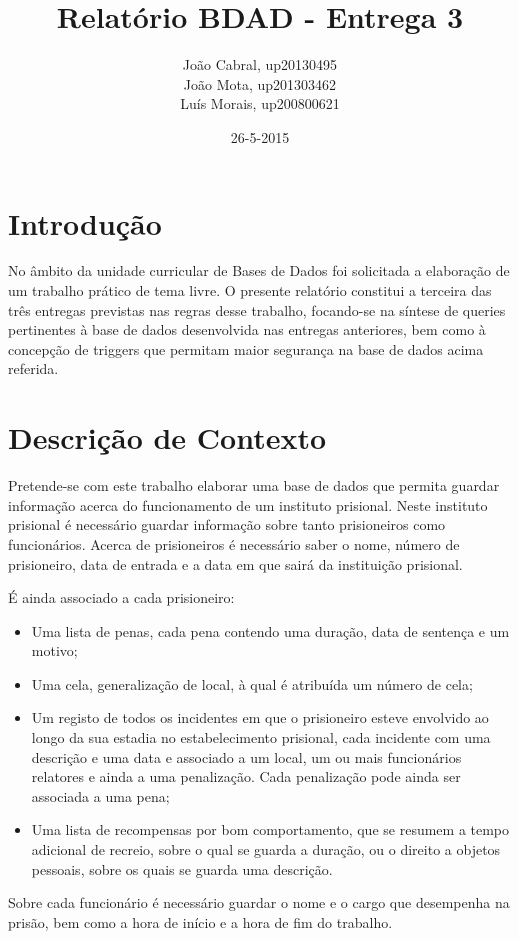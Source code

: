 \documentclass{article}
\title{Relatório BDAD - Entrega 3}
\date{26-5-2015}
\author{João Cabral, up20130495\\
	   João Mota, up201303462\\
	   Luís Morais, up200800621\\}
\begin{document}
\maketitle
{}
\newpage
{}
\renewcommand*\contentsname{Sumário}
\tableofcontents
\newpage
\section{Introdução}
No âmbito da unidade curricular de Bases de Dados foi solicitada a elaboração de um
trabalho prático de tema livre. O presente relatório constitui a terceira das três entregas
previstas nas regras desse trabalho, focando-se na síntese de queries pertinentes à 
base de dados desenvolvida nas entregas anteriores, bem como
à concepção de triggers que permitam maior segurança na base de dados acima referida.


\section{Descrição de Contexto}
Pretende-se com este trabalho elaborar uma base de dados que permita guardar
informação acerca do funcionamento de um instituto prisional. Neste instituto prisional é
necessário guardar informação sobre tanto prisioneiros como funcionários.
Acerca de prisioneiros é necessário saber o nome, número de prisioneiro, data de entrada
e a data em que sairá da instituição prisional.

É ainda associado a cada prisioneiro:
\begin{itemize}
\item Uma lista de penas, cada pena contendo uma duração, data de sentença e um motivo;
\item Uma cela, generalização de local, à qual é atribuída um número de cela;
\item Um registo de todos os incidentes em que o prisioneiro esteve envolvido ao longo da sua estadia no estabelecimento prisional, cada incidente com uma descrição e uma data e associado a um local, um ou mais funcionários relatores e ainda a uma penalização. Cada penalização pode ainda ser associada a uma pena;
\item Uma lista de recompensas por bom comportamento, que se resumem a tempo adicional de recreio, sobre o qual se guarda a duração, ou o direito a objetos pessoais, sobre os quais se guarda uma descrição.
\end{itemize}
Sobre cada funcionário é necessário guardar o nome e o cargo que desempenha na prisão, bem como a hora de início e a hora de fim do trabalho.
\newpage
\end{document}
